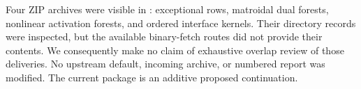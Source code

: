 Four ZIP archives were visible in : exceptional rows, matroidal dual forests, nonlinear activation forests, and ordered interface kernels. Their directory records were inspected, but the available binary-fetch routes did not provide their contents. We consequently make no claim of exhaustive overlap review of those deliveries. No upstream default, incoming archive, or numbered report was modified. The current package is an additive proposed continuation.
